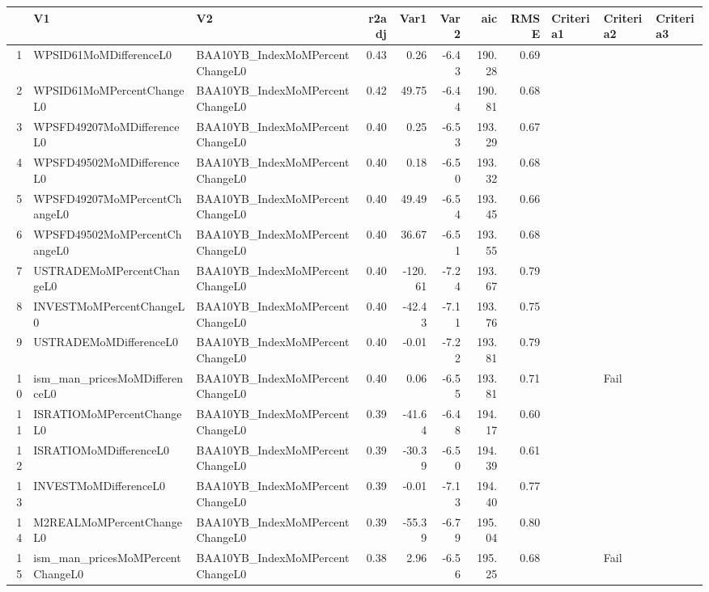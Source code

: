 \begin{longtable}{rllrrrrrlll}
  \hline
 & V1 & V2 & r2adj & Var1 & Var2 & aic & RMSE & Criteria1 & Criteria2 & Criteria3 \\ 
  \hline
1 & WPSID61MoMDifferenceL0 & BAA10YB\_IndexMoMPercentChangeL0 & 0.43 & 0.26 & -6.43 & 190.28 & 0.69 &  &  &  \\ 
  2 & WPSID61MoMPercentChangeL0 & BAA10YB\_IndexMoMPercentChangeL0 & 0.42 & 49.75 & -6.44 & 190.81 & 0.68 &  &  &  \\ 
  3 & WPSFD49207MoMDifferenceL0 & BAA10YB\_IndexMoMPercentChangeL0 & 0.40 & 0.25 & -6.53 & 193.29 & 0.67 &  &  &  \\ 
  4 & WPSFD49502MoMDifferenceL0 & BAA10YB\_IndexMoMPercentChangeL0 & 0.40 & 0.18 & -6.50 & 193.32 & 0.68 &  &  &  \\ 
  5 & WPSFD49207MoMPercentChangeL0 & BAA10YB\_IndexMoMPercentChangeL0 & 0.40 & 49.49 & -6.54 & 193.45 & 0.66 &  &  &  \\ 
  6 & WPSFD49502MoMPercentChangeL0 & BAA10YB\_IndexMoMPercentChangeL0 & 0.40 & 36.67 & -6.51 & 193.55 & 0.68 &  &  &  \\ 
  7 & USTRADEMoMPercentChangeL0 & BAA10YB\_IndexMoMPercentChangeL0 & 0.40 & -120.61 & -7.24 & 193.67 & 0.79 &  &  &  \\ 
  8 & INVESTMoMPercentChangeL0 & BAA10YB\_IndexMoMPercentChangeL0 & 0.40 & -42.43 & -7.11 & 193.76 & 0.75 &  &  &  \\ 
  9 & USTRADEMoMDifferenceL0 & BAA10YB\_IndexMoMPercentChangeL0 & 0.40 & -0.01 & -7.22 & 193.81 & 0.79 &  &  &  \\ 
  10 & ism\_man\_pricesMoMDifferenceL0 & BAA10YB\_IndexMoMPercentChangeL0 & 0.40 & 0.06 & -6.55 & 193.81 & 0.71 &  & Fail &  \\ 
  11 & ISRATIOMoMPercentChangeL0 & BAA10YB\_IndexMoMPercentChangeL0 & 0.39 & -41.64 & -6.48 & 194.17 & 0.60 &  &  &  \\ 
  12 & ISRATIOMoMDifferenceL0 & BAA10YB\_IndexMoMPercentChangeL0 & 0.39 & -30.39 & -6.50 & 194.39 & 0.61 &  &  &  \\ 
  13 & INVESTMoMDifferenceL0 & BAA10YB\_IndexMoMPercentChangeL0 & 0.39 & -0.01 & -7.13 & 194.40 & 0.77 &  &  &  \\ 
  14 & M2REALMoMPercentChangeL0 & BAA10YB\_IndexMoMPercentChangeL0 & 0.39 & -55.39 & -6.79 & 195.04 & 0.80 &  &  &  \\ 
  15 & ism\_man\_pricesMoMPercentChangeL0 & BAA10YB\_IndexMoMPercentChangeL0 & 0.38 & 2.96 & -6.56 & 195.25 & 0.68 &  & Fail &  \\ 

\end{longtable}
